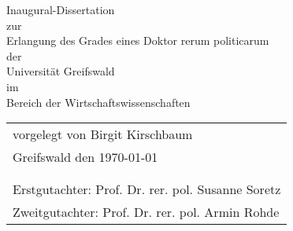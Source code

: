 \documentclass[12pt, xcolor=dvipsnames]{report}
\begin{document}
\begin{center}
Inaugural-Dissertation \\
\vspace{4mm} zur \\
\vspace{4mm} Erlangung des Grades eines Doktor rerum politicarum\\
\vspace{4mm} der \\
\vspace{4mm} Universit{\"a}t Greifswald \\
\vspace{4mm} im \\
\vspace{4mm} Bereich der Wirtschaftswissenschaften \\
\vspace{10mm}
\begin{flushleft}
		\begin{tabular}{l} 
			vorgelegt von Birgit Kirschbaum\\
			Greifswald den \today\\
			{}\\
			{}\\
			Erstgutachter: Prof. Dr. rer. pol. Susanne Soretz\\
			Zweitgutachter: Prof. Dr. rer. pol. Armin Rohde
			
		\end{tabular}
\end{flushleft}
\end{center}
\newpage
\end{document}
